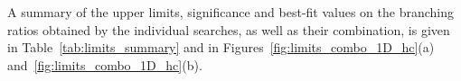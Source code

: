 A summary of the upper limits, significance and best-fit values on the branching ratios obtained by the individual searches, as well as their combination, is given  
in Table~\ref{tab:limits_summary} and in Figures~\ref{fig:limits_combo_1D_hc}(a) and~\ref{fig:limits_combo_1D_hc}(b).


